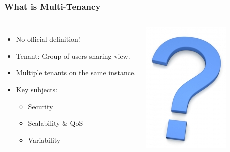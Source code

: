 \documentclass{beamer}
\begin{document}
\begin{frame}\frametitle{\textbf{\LARGE{\textrm{What is Multi-Tenancy}}}}
	\begin{columns}
		\begin{itemize}
			\item No official definition! %
			\item Tenant: Group of users sharing view.
			\item Multiple tenants on the same instance.
			\item Key subjects:
				\begin{itemize}
				\item Security
				\item Scalability \& QoS
				\item Variability
				\end{itemize}
		\end{itemize}
		\includegraphics[width=.8\columnwidth]{images/large_questionmark.jpg}
	\end{columns}
\end{frame}
\end{document}
